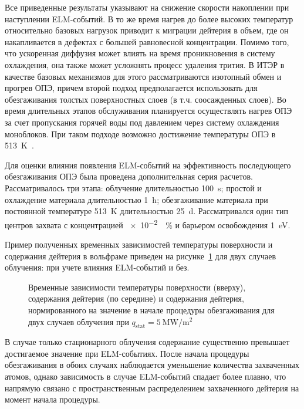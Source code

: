 Все приведенные результаты указывают на снижение скорости накоплении при наступлении ELM-событий. В то же время нагрев до более высоких температур относительно базовых нагрузок приводит к миграции дейтерия в объем, где он накапливается в дефектах с большей равновесной концентрации. Помимо того, что ускоренная диффузия может влиять на время проникновения в систему охлаждения, она также может усложнять процесс удаления трития. В ИТЭР в качестве базовых механизмов для этого рассматриваются изотопный обмен и прогрев ОПЭ, причем второй подход предполагается использовать для обезгаживания толстых поверхностных слоев (в т.ч. соосажденных слоев). Во время длительных этапов обслуживания планируется осуществлять нагрев ОПЭ за счет пропускания горячей воды под давлением через систему охлаждения моноблоков. При таком подходе возможно достижение температуры ОПЭ в \SI{513}{\kelvin}~\cite{Pitts2025}.

Для оценки влияния появления ELM-событий на эффективность последующего обезгаживания ОПЭ была проведена дополнительная серия расчетов. Рассматривалось три этапа: облучение длительностью \SI{100}{\second}; простой и охлаждение материала длительностью \SI{1}{\hour}; обезгаживание материала при постоянной температуре \SI{513}{\kelvin} длительностью \SI{25}{\day}. Рассматривался один тип центров захвата с концентрацией \SI{e-2}{\percent} и барьером освобождения \SI{1}{\electronvolt}. 

Пример полученных временных зависимостей температуры поверхности и содержания дейтерия в вольфраме приведен на рисунке~\cref{fig:ch3/baking_single} для двух случаев облучения: при учете влияния ELM-событий и без.
\begin{figure}[ht]
	\caption{Временные зависимости температуры поверхности (вверху), содержания дейтерия (по середине) и содержания дейтерия, нормированного на значение в начале процедуры обезгаживания для двух случаев облучения при \(q_\mathrm{stat}= \SI{5}{\mega\watt\per\meter\squared}\)}\label{fig:ch3/baking_single}
\end{figure}
В случае только стационарного облучения содержание существенно превышает достигаемое значение при ELM-событиях. После начала процедуры обезгаживания в обоих случаях наблюдается уменьшение количества захваченных атомов, однако зависимость в случае ELM-событий спадает более плавно, что напрямую связано с пространственным распределением захваченного дейтерия на момент начала процедуры.

